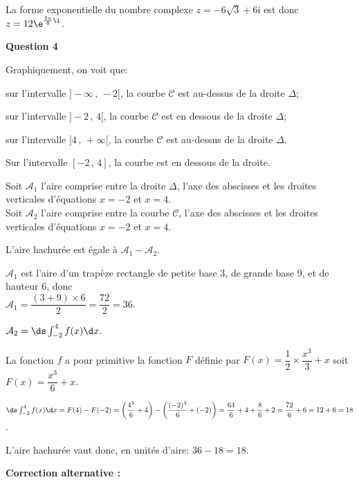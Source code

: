 La forme exponentielle du nombre complexe 
$z = - 6\sqrt 3 + 6\text{i}$
est donc $z = 12 \e^{\frac{5\pi}{6}\i}$.

\bigskip

\textbf{Question 4}

\medskip

\begin{list}{\textbullet}{Graphiquement, on voit que:}
\item sur l'intervalle $]-\infty\,,\, -2[$, la courbe $\mathcal{C}$ est au-dessus de la droite $\Delta$;
\item sur l'intervalle $]-2\,,\, 4[$, la courbe $\mathcal{C}$ est en dessous de la droite $\Delta$;
\item sur l'intervalle $]4\,,\, +\infty[$, la courbe $\mathcal{C}$ est au-dessus de la droite $\Delta$.
\end{list}

Sur l'intervalle $[-2\,,\,4]$, la courbe est en dessous de la droite.

Soit $\mathcal{A}_1$ l'aire comprise entre la droite $\Delta$, l'axe des abscisses et les droites verticales d'équations $x=-2$ et $x=4$.\\
Soit $\mathcal{A}_2$ l'aire comprise entre la courbe $\mathcal{C}$, l'axe des abscisses et les droites verticales d'équations $x=-2$ et $x=4$.

L'aire hachurée est égale à $\mathcal{A}_1-\mathcal{A}_2$.

\begin{list}{\textbullet}{}
\item $\mathcal{A}_1$ est l'aire d'un trapèze rectangle de petite base 3, de grande base 9, et de hauteur 6, donc\\
 $\mathcal{A}_1=\dfrac{\left (3+ 9\right )\times 6 }{2}=\dfrac{72}{2}=36$.
\item $\mathcal{A}_2 = \ds\int_{-2}^{4}f(x) \d x$.

La fonction $f$ a pour primitive la fonction $F$ définie par $F(x)=\dfrac{1}{2}\times \dfrac{x^3}{3}+x$ soit $F(x)=\dfrac{x^3}{6}+x$.

$\ds\int_{-2}^{4}f(x) \d x 
= F(4)-F(-2)
= \left ( \dfrac{4^3}{6} + 4 \right ) - \left ( \dfrac{(-2)^3}{6} + (-2)\right )
= \dfrac{64}{6}+ 4 + \dfrac{8}{6} + 2
= \dfrac{72}{6}+6 = 12+6=18$.
\end{list}

L'aire hachurée vaut donc, en unités d'aire: $36 - 18 = 18$.

\textbf{Correction alternative :}

